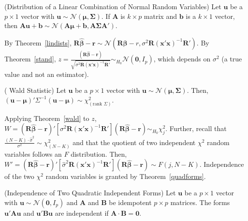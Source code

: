 \begin{theorem} \label{lindists} (Distribution of a Linear Combination of Normal Random Variables) Let $\bm{u}$ be a $p \times 1$ vector with $\bm{u} \sim \mathcal{N} \left( \bm{\mu}, \bm{\Sigma} \right)$. If $\bm{A}$ is $k \times p$ matrix and $\bm{b}$ is a $k \times 1$ vector, then $\bm{A} \bm{u} + \bm{b} \sim \mathcal{N} \left( \bm{A} \bm{\mu} + \bm{b}, \bm{A} \bm{\Sigma} \bm{A}'  \right)$.  	
\end{theorem}

\noindent By Theorem~\ref{lindists}, $\bm{R} \bm{\hat{\beta}} - \bm{r} \sim \mathcal{N} \left( \bm{R} \bm{\beta} - r , \sigma^2 \bm{R} { \left( \bm{x}' \bm{x} \right) }^{-1} \bm{R}' \right)$. By Theorem~\ref{stand}, $z = \frac{ \left( \bm{R} \bm{\hat{\beta}} - \bm{r} \right) } { \sqrt{ \sigma^2 \bm{R} { \left( \bm{x}' \bm{x} \right) }^{-1} \bm{R}' } } \sim_{H_0} \mathcal{N} \left( \bm{0}, I_p \right)$, which depends on $\sigma^2$ (a true value and not an estimator).   

\begin{theorem} \label{wald} ( Wald Statistic) Let $\bm{u}$ be a $p \times 1$ vector with $\bm{u} \sim \mathcal{N} \left( \bm{\mu}, \bm{\Sigma} \right)$. Then,\\ $\left( \bm{u} - \bm{\mu} \right)' \Sigma^{-1} \left( \bm{u} - \bm{\mu} \right) \sim \chi_{ ( \text{rank } \Sigma ) }^2$. 
\end{theorem}

\noindent Applying Theorem~\ref{wald} to $z$, $W = \left( \bm{R} \bm{\hat{\beta}} - \bm{r} \right)' \left[ \sigma^2 \bm{R} {\left( \bm{x}' \bm{x} \right)}^{-1} \bm{R}'  \right] \left( \bm{R} \bm{\hat{\beta}} - \bm{r} \right) \sim_{H_0} \chi_{j}^2$. Further, recall that $\frac{ \left( N - K \right) \cdot  \hat{\sigma}^2 }{ \sigma^2 } \sim \chi_{(N-K)}^2$ and that the quotient of two independent $\chi^2$ random variables follows an $F$ distribution. Then, $W' = \left( \bm{R} \bm{\hat{\beta}} - \bm{r} \right)' \left[ \hat{\sigma}^2 \bm{R} {\left( \bm{x}' \bm{x} \right)}^{-1} \bm{R}'  \right] \left( \bm{R} \bm{\hat{\beta}} - \bm{r} \right) \sim F \left( j, N - K \right)$. Independence of the two $\chi^2$ random variables is granted by Theorem~\ref{quadforms}.\\

\begin{theorem} \label{quadforms} (Independence of Two Quadratic Independent Forms) Let $\bm{u}$ be a $p \times 1$ vector with $\bm{u} \sim \mathcal{N} \left( \bm{0}, I_p \right)$ and $\bm{A}$ and $\bm{B}$ be idempotent $p \times p$ matrices. The forms $\bm{u}' \bm{A} \bm{u}$ and $\bm{u}' \bm{B} \bm{u}$ are independent if $\bm{A} \cdot \bm{B} = \bm{0}$. 
\end{theorem}

